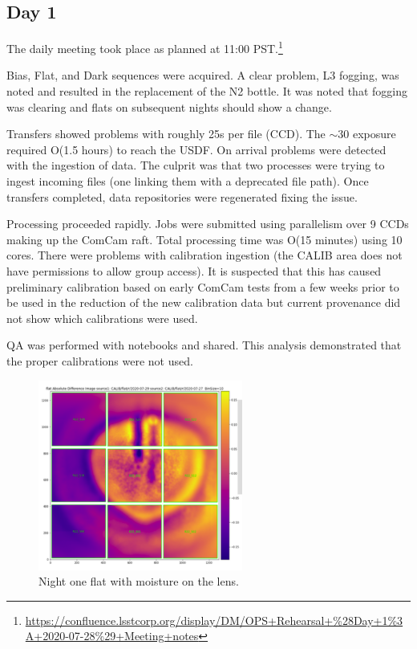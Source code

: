 \subsection{Day 1} \label{sec:day1}

The daily meeting took place as planned at 11:00 PST.\footnote{\url{https://confluence.lsstcorp.org/display/DM/OPS+Rehearsal+\%28Day+1\%3A+2020-07-28\%29+Meeting+notes}}

Bias, Flat, and Dark sequences were acquired.  A clear problem, L3 fogging, was
noted and resulted in the replacement of the N2 bottle.  It was noted that
fogging was clearing and flats on subsequent nights should show a change.

Transfers showed problems with roughly 25s per file (CCD).  The $\sim$30 exposure
required O(1.5 hours) to reach the USDF.  On arrival problems were detected with
the ingestion of data.  The culprit was that two processes were trying to ingest
incoming files (one linking them with a deprecated file path).  Once transfers
completed, data repositories were regenerated fixing the issue.

Processing proceeded rapidly.  Jobs were submitted using parallelism over 9 CCDs
making up the ComCam raft.  Total processing time was O(15 minutes) using 10 cores.
There were problems with calibration ingestion (the CALIB area does not have
permissions to allow group access).  It is suspected that this has caused preliminary
calibration based on early ComCam tests from a few weeks prior to be used in the
reduction of the new calibration data but current provenance did not show
which calibrations were used.

QA was performed with notebooks  and shared.  This analysis demonstrated that the
proper calibrations were not used.

\begin{figure}
\begin{center}
\includegraphics[width=0.6\textwidth]{figures/n1moist}
\end{center}
\caption{Night one flat with moisture on the lens.\label{fig:d1}}
\end{figure}

